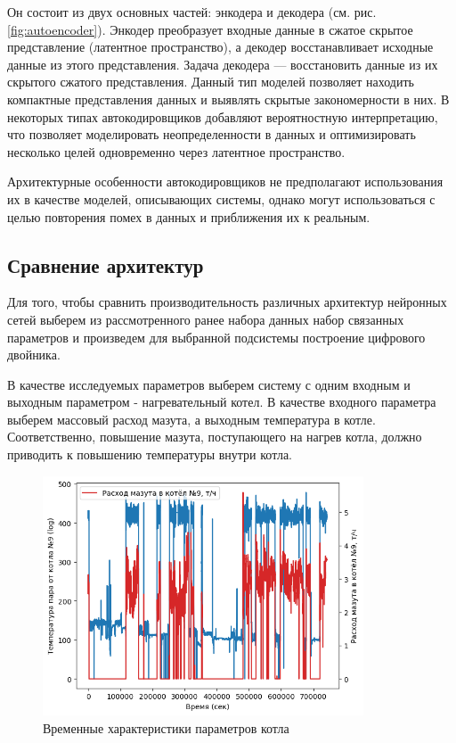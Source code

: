 Он состоит из двух основных частей: энкодера и декодера (см. рис.
\ref{fig:autoencoder}). Энкодер преобразует входные данные в сжатое скрытое
представление (латентное пространство), а декодер восстанавливает исходные
данные из этого представления. Задача декодера — восстановить данные из их
скрытого сжатого представления. Данный тип моделей позволяет находить компактные
представления данных и выявлять скрытые закономерности в них. В некоторых типах
автокодировщиков добавляют вероятностную интерпретацию, что позволяет
моделировать неопределенности в данных и оптимизировать несколько целей
одновременно через латентное пространство.

Архитектурные особенности автокодировщиков не предполагают использования их в
качестве моделей, описывающих системы, однако могут использоваться с целью
повторения помех в данных и приближения их к реальным.

\subsection{Сравнение архитектур}

Для того, чтобы сравнить производительность различных архитектур нейронных сетей
выберем из рассмотренного ранее набора данных набор связанных параметров и
произведем для выбранной подсистемы построение цифрового двойника. 

В качестве исследуемых параметров выберем систему с одним входным и выходным
параметром - нагревательный котел. В качестве входного параметра выберем
массовый расход мазута, а выходным температура в котле. Соответственно,
повышение мазута, поступающего на нагрев котла, должно приводить к повышению
температуры внутри котла. 

\begin{figure}[H]
  \centering
    \includegraphics[width=0.85\textwidth]{figures/plots/kotel_temp_mazut.png}
  \caption{Временные характеристики параметров котла}\label{fig:plt:kotel}
\end{figure}

